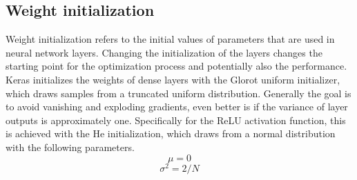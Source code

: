 \documentclass{article}
\begin{document}
\subsection{Weight initialization}
Weight initialization refers to the initial values of parameters that are used in neural network layers.
Changing the initialization of the layers changes the starting point for the optimization process and potentially also the performance.
Keras initializes the weights of dense layers with the Glorot uniform initializer, which draws samples from a truncated uniform distribution.
Generally the goal is to avoid vanishing and exploding gradients, even better is if the variance of layer outputs is approximately one. \cite{kumar2017weight}
Specifically for the ReLU activation function, this is achieved with the He initialization, which draws from a normal distribution with the following parameters. \cite{he2015delving}\\
  \begin{equation}
    \mu = 0
  \end{equation}
  \begin{equation}
    \sigma^2 = 2/N
  \end{equation}
\end{document}
